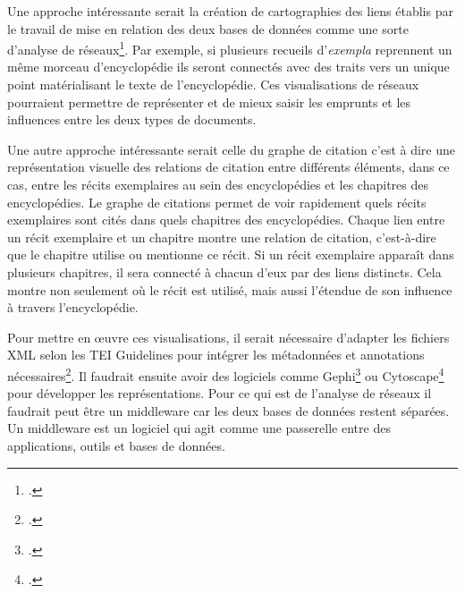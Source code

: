 Une approche intéressante serait la création de cartographies des liens établis par le travail de mise en relation des deux bases de données comme une sorte d'analyse de réseaux\footcite{beauguitteAnalyseReseauxSciences2016}. Par exemple, si plusieurs recueils d'\textit{exempla} reprennent un même morceau d'encyclopédie ils seront connectés avec des traits vers un unique point matérialisant le texte de l'encyclopédie. Ces visualisations de réseaux pourraient permettre de représenter et de mieux saisir les emprunts et les influences entre les deux types de documents. 

Une autre approche intéressante serait celle du graphe de citation c'est à dire une représentation visuelle des relations de citation entre différents éléments, dans ce cas, entre les récits exemplaires au sein des encyclopédies et les chapitres des encyclopédies. Le graphe de citations permet de voir rapidement quels récits exemplaires sont cités dans quels chapitres des encyclopédies. Chaque lien entre un récit exemplaire et un chapitre montre une relation de citation, c'est-à-dire que le chapitre utilise ou mentionne ce récit. Si un récit exemplaire apparaît dans plusieurs chapitres, il sera connecté à chacun d'eux par des liens distincts. Cela montre non seulement où le récit est utilisé, mais aussi l'étendue de son influence à travers l'encyclopédie.

Pour mettre en œuvre ces visualisations, il serait nécessaire d'adapter les fichiers XML selon les TEI Guidelines pour intégrer les métadonnées et annotations nécessaires\footcite{20GraphsNetworks}. Il faudrait ensuite avoir des logiciels comme Gephi\footcite{GephiOpenGraph} ou Cytoscape\footcite{CytoscapeOpenSource} pour développer les représentations. Pour ce qui est de l'analyse de réseaux il faudrait peut être un middleware car les deux bases de données restent séparées. Un middleware est un logiciel qui agit comme une passerelle entre des applications, outils et bases de données. 